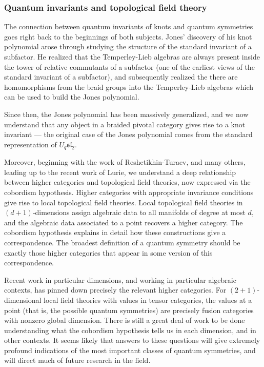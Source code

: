 \documentclass[11pt]{article}
\begin{document}
\subsubsection{Quantum invariants and topological field theory}
The connection between quantum invariants of knots and quantum symmetries goes right back to the beginnings of both subjects. Jones' discovery of his knot polynomial arose through studying the structure of the standard invariant of a subfactor. He
realized that the Temperley-Lieb algebras are always present inside the tower of relative commutants of a subfactor (one of the earliest views of the standard invariant of a subfactor),
and subsequently realized the there are homomorphisms from the braid groups into the Temperley-Lieb algebras which can be used to build the Jones polynomial.

Since then, the Jones polynomial has been massively generalized, and we now understand that any object in a braided pivotal category  gives rise to a knot invariant --- the original case of the Jones polynomial comes from the standard representation of $U_q \mathfrak{sl}_2$.

Moreover, beginning with the work of Reshetikhin-Turaev, and many others, leading up to the recent work of Lurie, we understand a deep relationship between higher categories and  topological field theories, now expressed via the cobordism hypothesis. Higher categories with appropriate invariance conditions give rise to local topological field theories. Local topological field theories in $(d+1)$-dimensions assign algebraic data to all manifolds of degree at most $d$, and the algebraic data associated to a point recovers a higher category. The cobordism hypothesis explains in detail how these constructions give a correspondence. The broadest definition of a quantum symmetry should be exactly those higher categories that appear in some version of this correspondence.

Recent work in particular dimensions, and working in particular algebraic contexts, has pinned down precisely the relevant higher categories. For $(2+1)$-dimensional local field theories with values in tensor categories, the values at a point (that is, the possible quantum symmetries) are precisely fusion categories with nonzero global dimension. There is still a great deal of work
to be done understanding what the cobordism hypothesis tells us in each dimension, and in other contexts. It seems likely that answers to these questions will give extremely profound indications of the most important classes of quantum symmetries, and will direct much of future research in the field.
\end{document}
